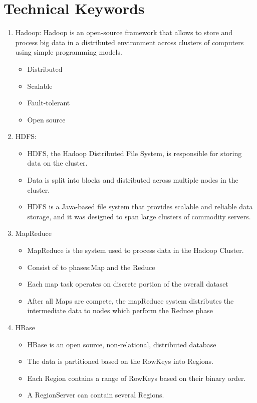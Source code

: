 \documentclass[oneside,a4paper,12pt]{report}
\begin{document}
\section{Technical Keywords}
\begin{enumerate}
\item Hadoop: Hadoop is an open-source framework that allows to store and process big data in a distributed environment across clusters of computers using simple programming models. 
\begin{itemize}
\item Distributed
\item Scalable
\item Fault-tolerant
\item Open source
\end{itemize}

\item HDFS:
\begin{itemize}
\item HDFS, the Hadoop Distributed File System, is responsible for storing data on the cluster.
\item Data is split into blocks and distributed across multiple nodes in the cluster. 
\item HDFS is a Java-based file system that provides scalable and reliable data storage, and it was designed to span large clusters of commodity servers.
\end{itemize}


\item MapReduce
\begin{itemize}
\item MapReduce is the system used to process data in the Hadoop Cluster.
\item Consist of to phases:Map and the Reduce
\item Each map task operates on discrete portion of the overall dataset
\item After all Maps are compete, the mapReduce system distributes the intermediate data to nodes which perform the Reduce phase
\end{itemize}

\item HBase
\begin{itemize}
\item HBase is an open source, non-relational, distributed database 
\item The data is partitioned based on the RowKeys into Regions.
\item Each Region contains a range of RowKeys based on their binary order.
\item A RegionServer can contain several Regions.
\end{itemize}


\end{enumerate}
\end{document}
